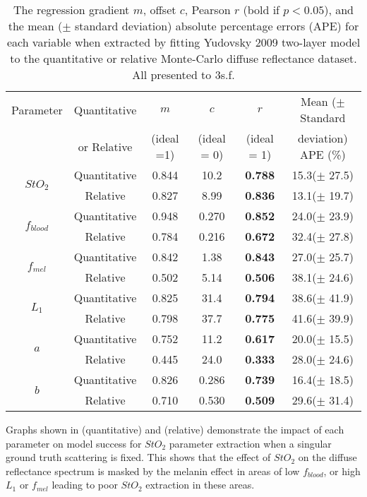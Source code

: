 \begin{table}[t]
    \centering
    \caption{The regression gradient $m$, offset $c$, Pearson $r$ (bold if $p<0.05$), and the mean ($\pm$ standard deviation) absolute percentage errors (APE) for each variable when extracted by fitting Yudovsky 2009 two-layer model to the quantitative or relative Monte-Carlo diffuse reflectance dataset. All presented to 3s.f.}
    \begin{tabular}{|c|c|cccc|}
        \hline
        Parameter & Quantitative & $m$ & $c$ & $r$ & Mean ($\pm$ Standard  \\
        & or Relative & (ideal =1) & (ideal = 0) & (ideal = 1) & deviation) APE (\%)\\
        \hline
        \multirow{2}{*}{$StO_2$} & Quantitative & 0.844 & 10.2 & \textbf{0.788} & 15.3($\pm$ 27.5) \\
        & Relative & 0.827 & 8.99 & \textbf{0.836} & 13.1($\pm$ 19.7) \\
        \hline
        \multirow{2}{*}{$f_{blood}$} & Quantitative & 0.948 & 0.270 & \textbf{0.852} & 24.0($\pm$ 23.9) \\
        & Relative & 0.784 & 0.216 & \textbf{0.672} & 32.4($\pm$ 27.8) \\
        \hline
        \multirow{2}{*}{$f_{mel}$} & Quantitative & 0.842 & 1.38 & \textbf{0.843} & 27.0($\pm$ 25.7) \\
        & Relative & 0.502 & 5.14 & \textbf{0.506} & 38.1($\pm$ 24.6) \\
        \hline
        \multirow{2}{*}{$L_1$} & Quantitative & 0.825 & 31.4 & \textbf{0.794} & 38.6($\pm$ 41.9) \\
         & Relative & 0.798 & 37.7 & \textbf{0.775} & 41.6($\pm$ 39.9) \\
        \hline
        \multirow{2}{*}{$a$} & Quantitative & 0.752 & 11.2 & \textbf{0.617} & 20.0($\pm$ 15.5) \\
        & Relative & 0.445 & 24.0 & \textbf{0.333} & 28.0($\pm$ 24.6) \\
        \hline
        \multirow{2}{*}{$b$} & Quantitative & 0.826 & 0.286 & \textbf{0.739} & 16.4($\pm$ 18.5) \\
        & Relative & 0.710 & 0.530 & \textbf{0.509} & 29.6($\pm$ 31.4) \\
        \hline
    \end{tabular}
    \label{tb:doubleparamtrends}
\end{table}
Graphs shown in  (quantitative) and  (relative) demonstrate the impact of each parameter on model success for $StO_2$ parameter extraction when a singular ground truth scattering is fixed. This shows that the effect of $StO_2$ on the diffuse reflectance spectrum is masked by the melanin effect in areas of low $f_{blood}$, or high $L_1$ or $f_{mel}$ leading to poor $StO_2$ extraction in these areas. 
\FloatBarrier

